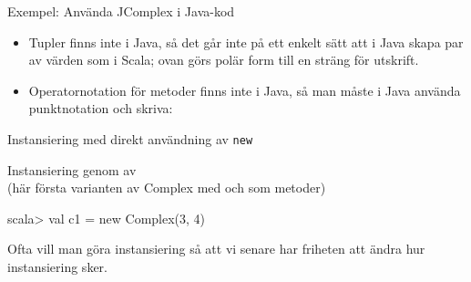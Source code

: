 \begin{Slide}{Exempel: Använda JComplex i Java-kod}\SlideFontSmall
{}
\begin{itemize}
\item Tupler finns inte i Java, så det går inte på ett enkelt sätt att i Java skapa par av värden som i Scala; ovan görs polär form till en sträng för utskrift.

\item Operatornotation för metoder finns inte i Java, så man måste i Java använda punktnotation och skriva: 
\end{itemize}
\end{Slide}




\begin{Slide}{Instansiering med direkt användning av \texttt{new}}

Instansiering genom  av \\
{\SlideFontSmall (här första varianten av Complex med  och  som metoder)} 
\begin{REPLnonum}
scala> val c1 = new Complex(3, 4)
\end{REPLnonum}
\pause
Ofta vill man göra  instansiering så att vi senare har friheten att ändra hur instansiering sker.
\end{Slide}



